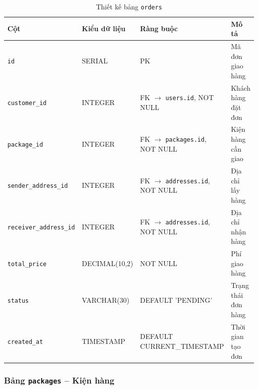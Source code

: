 \begin{table}[H]
\centering
\caption{Thiết kế bảng \texttt{orders}}
\begin{tabularx}{\textwidth}{|l|l|Z|Z|}
\hline
\textbf{Cột} &
\textbf{Kiểu dữ liệu} &
\textbf{Ràng buộc} &
\textbf{Mô tả} \\ \hline

\texttt{id}
& SERIAL
& PK
& Mã đơn giao hàng \\ \hline

\texttt{customer\_id}
& INTEGER
& FK $\rightarrow$ \texttt{users.id}, NOT NULL
& Khách hàng đặt đơn \\ \hline

\texttt{package\_id}
& INTEGER
& FK $\rightarrow$ \texttt{packages.id}, NOT NULL
& Kiện hàng cần giao \\ \hline

\texttt{sender\_address\_id}
& INTEGER
& FK $\rightarrow$ \texttt{addresses.id}, NOT NULL
& Địa chỉ lấy hàng \\ \hline

\texttt{receiver\_address\_id}
& INTEGER
& FK $\rightarrow$ \texttt{addresses.id}, NOT NULL
& Địa chỉ nhận hàng \\ \hline

\texttt{total\_price}
& DECIMAL(10,2)
& NOT NULL
& Phí giao hàng \\ \hline

\texttt{status}
& VARCHAR(30)
& DEFAULT 'PENDING'
& Trạng thái đơn hàng \\ \hline

\texttt{created\_at}
& TIMESTAMP
& DEFAULT CURRENT\_TIMESTAMP
& Thời gian tạo đơn \\ \hline

\end{tabularx}
\end{table}



\subsubsection{Bảng \texttt{packages} -- Kiện hàng}

